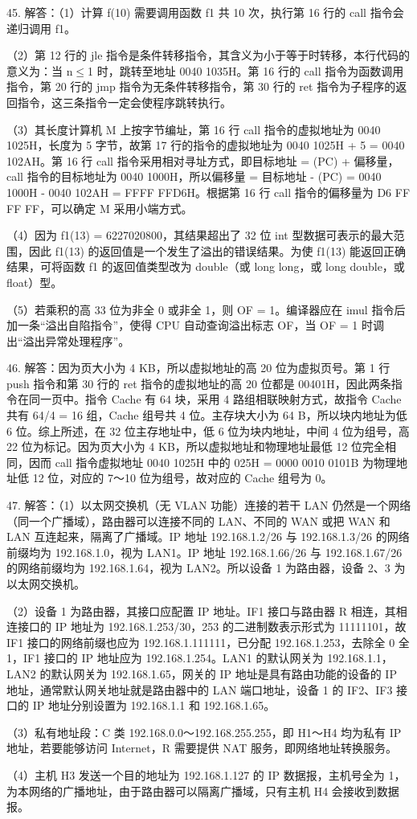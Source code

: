 \documentclass[UTF8,11pt]{ctexart}
\begin{document}
45. 解答：（1）计算 f(10) 需要调用函数 f1 共 10 次，执行第 16 行的 call 指令会递归调用 f1。


（2）第 12 行的 jle 指令是条件转移指令，其含义为小于等于时转移，本行代码的意义为：当 n\(\displaystyle \le\)1 时，跳转至地址 0040 1035H。第 16 行的 call 指令为函数调用指令，第 20 行的 jmp 指令为无条件转移指令，第 30 行的 ret 指令为子程序的返回指令，这三条指令一定会使程序跳转执行。


（3）其长度计算机 M 上按字节编址，第 16 行 call 指令的虚拟地址为 0040 1025H，长度为 5 字节，故第 17 行的指令的虚拟地址为 0040 1025H + 5 = 0040 102AH。第 16 行 call 指令采用相对寻址方式，即目标地址 = (PC) + 偏移量，call 指令的目标地址为 0040 1000H，所以偏移量 = 目标地址 - (PC) = 0040 1000H - 0040 102AH = FFFF FFD6H。根据第 16 行 call 指令的偏移量为 D6 FF FF FF，可以确定 M 采用小端方式。


（4）因为 f1(13) = 6227020800，其结果超出了 32 位 int 型数据可表示的最大范围，因此 f1(13) 的返回值是一个发生了溢出的错误结果。为使 f1(13) 能返回正确结果，可将函数 f1 的返回值类型改为 double（或 long long，或 long double，或 float）型。


（5）若乘积的高 33 位为非全 0 或非全 1，则 OF = 1。编译器应在 imul 指令后加一条“溢出自陷指令”，使得 CPU 自动查询溢出标志 OF，当 OF = 1 时调出“溢出异常处理程序”。


46. 解答：因为页大小为 4 KB，所以虚拟地址的高 20 位为虚拟页号。第 1 行 push 指令和第 30 行的 ret 指令的虚拟地址的高 20 位都是 00401H，因此两条指令在同一页中。指令 Cache 有 64 块，采用 4 路组相联映射方式，故指令 Cache 共有 64/4 = 16 组，Cache 组号共 4 位。主存块大小为 64 B，所以块内地址为低 6 位。综上所述，在 32 位主存地址中，低 6 位为块内地址，中间 4 位为组号，高 22 位为标记。因为页大小为 4 KB，所以虚拟地址和物理地址最低 12 位完全相同，因而 call 指令虚拟地址 0040 1025H 中的 025H = 0000 0010 0101B 为物理地址低 12 位，对应的 7～10 位为组号，故对应的 Cache 组号为 0。


47. 解答：（1）以太网交换机（无 VLAN 功能）连接的若干 LAN 仍然是一个网络（同一个广播域），路由器可以连接不同的 LAN、不同的 WAN 或把 WAN 和 LAN 互连起来，隔离了广播域。IP 地址 192.168.1.2/26 与 192.168.1.3/26 的网络前缀均为 192.168.1.0，视为 LAN1。IP 地址 192.168.1.66/26 与 192.168.1.67/26 的网络前缀均为 192.168.1.64，视为 LAN2。所以设备 1 为路由器，设备 2、3 为以太网交换机。


（2）设备 1 为路由器，其接口应配置 IP 地址。IF1 接口与路由器 R 相连，其相连接口的 IP 地址为 192.168.1.253/30，253 的二进制数表示形式为 11111101，故 IF1 接口的网络前缀也应为 192.168.1.111111，已分配 192.168.1.253，去除全 0 全 1，IF1 接口的 IP 地址应为 192.168.1.254。LAN1 的默认网关为 192.168.1.1，LAN2 的默认网关为 192.168.1.65，网关的 IP 地址是具有路由功能的设备的 IP 地址，通常默认网关地址就是路由器中的 LAN 端口地址，设备 1 的 IF2、IF3 接口的 IP 地址分别设置为 192.168.1.1 和 192.168.1.65。


（3）私有地址段：C 类 192.168.0.0～192.168.255.255，即 H1～H4 均为私有 IP 地址，若要能够访问 Internet，R 需要提供 NAT 服务，即网络地址转换服务。


（4）主机 H3 发送一个目的地址为 192.168.1.127 的 IP 数据报，主机号全为 1，为本网络的广播地址，由于路由器可以隔离广播域，只有主机 H4 会接收到数据报。
\end{document}
